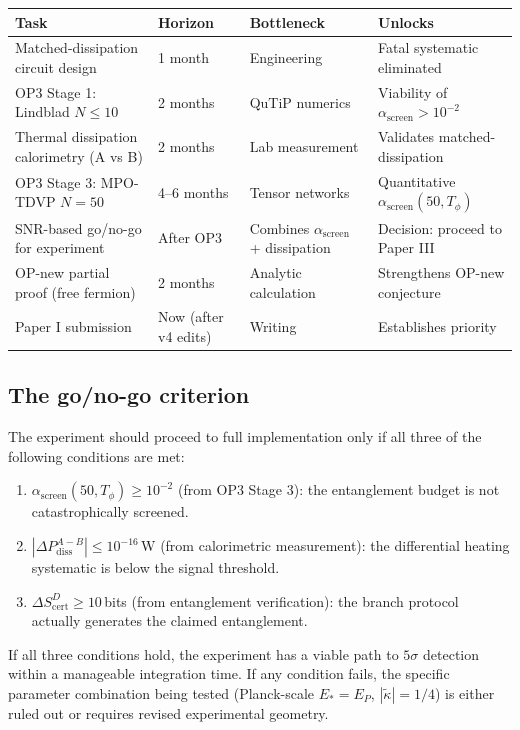 \documentclass[11pt,letterpaper]{article}
\newcommand{\kt}{\tilde{\kappa}}
\newcommand{\Scert}{S_{\mathrm{cert}}}
\newcommand{\asc}{\alpha_{\mathrm{screen}}}
\begin{document}
\begin{center}\small
\begin{tabular}{@{}p{4cm}p{2cm}p{3cm}p{3cm}@{}}
\toprule
Task & Horizon & Bottleneck & Unlocks \\
\midrule
Matched-dissipation circuit design
& 1 month
& Engineering
& Fatal systematic eliminated \\
\addlinespace
OP3 Stage 1: Lindblad $N\leq10$
& 2 months
& QuTiP numerics
& Viability of $\asc > 10^{-2}$ \\
\addlinespace
Thermal dissipation calorimetry (A vs B)
& 2 months
& Lab measurement
& Validates matched-dissipation \\
\addlinespace
OP3 Stage 3: MPO-TDVP $N=50$
& 4--6 months
& Tensor networks
& Quantitative $\asc(50, T_\phi)$ \\
\addlinespace
SNR-based go/no-go for experiment
& After OP3
& Combines $\asc$ + dissipation
& Decision: proceed to Paper III \\
\addlinespace
OP-new partial proof (free fermion)
& 2 months
& Analytic calculation
& Strengthens OP-new conjecture \\
\addlinespace
Paper I submission
& Now (after v4 edits)
& Writing
& Establishes priority \\
\bottomrule
\end{tabular}
\end{center}

\subsection{The go/no-go criterion}

The experiment should proceed to full implementation only if all three of the
following conditions are met:

\begin{enumerate}[noitemsep]
\item $\asc(50, T_\phi) \geq 10^{-2}$ (from OP3 Stage 3): the entanglement
  budget is not catastrophically screened.
\item $|\Delta P_{\mathrm{diss}}^{A-B}| \leq 10^{-16}$\,W (from calorimetric
  measurement): the differential heating systematic is below the signal threshold.
\item $\Delta\Scert^D \geq 10$\,bits (from entanglement verification): the
  branch protocol actually generates the claimed entanglement.
\end{enumerate}

If all three conditions hold, the experiment has a viable path to $5\sigma$
detection within a manageable integration time.  If any condition fails, the
specific parameter combination being tested (Planck-scale $E_* = E_P$, $|\kt| = 1/4$)
is either ruled out or requires revised experimental geometry.
\end{document}
